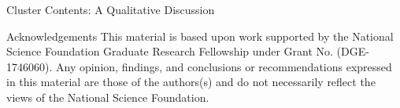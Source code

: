 \documentclass[final]{beamer} %
\begin{document}
\begin{frame}
\begin{columns}
\begin{column}{0.3\textwidth}
{\begin{block}{\boxnumber Cluster Contents: A Qualitative Discussion}
        \end{block}
        \vspace{.5cm}
        
        
        \begin{block}{\boxnumber Acknowledgements}
          \footnotesize{This material is based upon work supported by the National Science Foundation Graduate Research Fellowship under Grant No. (DGE-1746060). Any opinion, findings, and conclusions or recommendations expressed in this material are those of the authors(s) and do not necessarily reflect the views of the National Science Foundation.}
        \end{block}
        \vspace{.5cm}
        
      } %
    \end{column}
    
  \end{columns}
\end{frame}
\end{document}
